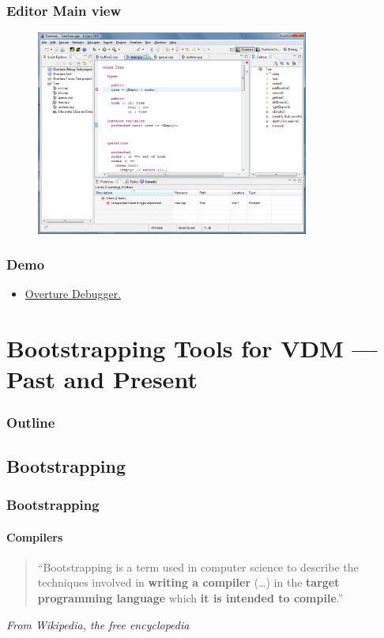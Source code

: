 \documentclass[slidestop,uncompress,mathserif,final]{beamer}
\newcommand{\from}[1]{%
\noindent%
\begin{flushright}%
    \emph{\footnotesize #1}%
\end{flushright}%
}
\begin{document}
\frame
{
  \frametitle{Editor Main view}

\begin{figure}[t]
\centering
\includegraphics[width=0.8\textwidth]{images/EditorOverview}
\label{fig:}
\end{figure}
}

\frame
{
  \frametitle{Demo}

  \begin{itemize}
  \item \href{http://mt.lausdahl.com/downloads/ScreenCasts/DemoOvertureDebugger/}{Overture Debugger.}     

  \end{itemize}
}


\section[Bootstrapping Tools for VDM]{Bootstrapping Tools for VDM --- Past and Present}
\label{sec:bootstrapping}

\begin{frame}[c]
  \frametitle{Outline}
  \tableofcontents[current]
\end{frame}

\subsection{Bootstrapping}
\begin{frame}[c]
  \frametitle{Bootstrapping}
  \framesubtitle{Compilers}


  \begin{quotation}
	``Bootstrapping is a term used in computer science to describe the techniques involved in \textbf{writing a compiler} (\dots) in the \textbf{target programming language} which \textbf{it is intended to compile}.''
  \end{quotation}
  \from{From Wikipedia, the free encyclopedia}
\end{frame}
\end{document}
